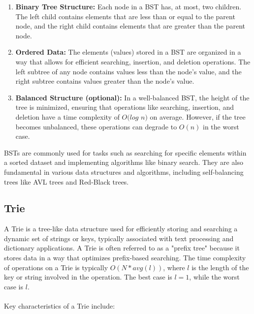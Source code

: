 \documentclass{article}
\begin{document}
\begin{enumerate}
    \item \textbf{Binary Tree Structure:} Each node in a BST has, at most, two children. The left child contains elements that are less than or equal to the parent node, and the right child contains elements that are greater than the parent node.

    \item \textbf{Ordered Data:} The elements (values) stored in a BST are organized in a way that allows for efficient searching, insertion, and deletion operations. The left subtree of any node contains values less than the node's value, and the right subtree contains values greater than the node's value.

    \item \textbf{Balanced Structure (optional):} In a well-balanced BST, the height of the tree is minimized, ensuring that operations like searching, insertion, and deletion have a time complexity of $O(log $ $n)$ on average. However, if the tree becomes unbalanced, these operations can degrade to $O(n)$ in the worst case.
\end{enumerate}
BSTs are commonly used for tasks such as searching for specific elements within a sorted dataset and implementing algorithms like binary search. They are also fundamental in various data structures and algorithms, including self-balancing trees like AVL trees and Red-Black trees.

\subsection{Trie}

A Trie is a tree-like data structure used for efficiently storing and searching a dynamic set of strings or keys, typically associated with text processing and dictionary applications. A Trie is often referred to as a "prefix tree" because it stores data in a way that optimizes prefix-based searching. The time complexity of operations on a Trie is typically $O(N * avg(l))$, where $l$ is the length of the key or string involved in the operation. The best case is $l = 1$, while the worst case is $l$.
\\
\\
Key characteristics of a Trie include:
\end{document}
